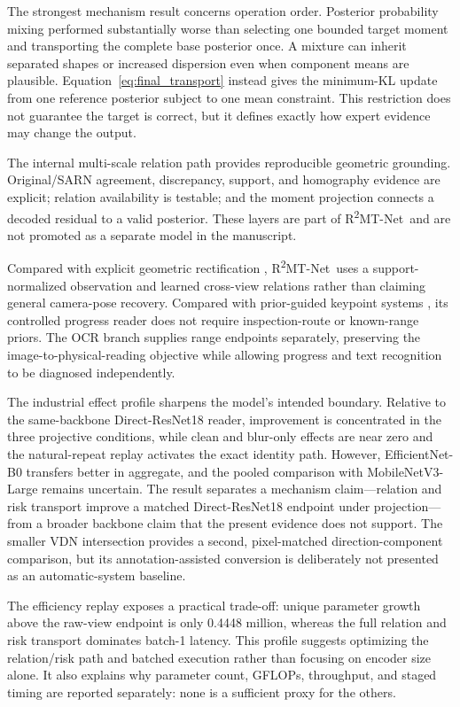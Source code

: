 \documentclass[electronics,article,submit,oneauthor]{Definitions/mdpi}
\newcommand{\modelname}{R\textsuperscript{2}MT-Net}
\begin{document}
The strongest mechanism result concerns operation order. Posterior probability mixing performed substantially worse than selecting one bounded target moment and transporting the complete base posterior once. A mixture can inherit separated shapes or increased dispersion even when component means are plausible. Equation~\eqref{eq:final_transport} instead gives the minimum-KL update from one reference posterior subject to one mean constraint. This restriction does not guarantee the target is correct, but it defines exactly how expert evidence may change the output.

The internal multi-scale relation path provides reproducible geometric grounding. Original/SARN agreement, discrepancy, support, and homography evidence are explicit; relation availability is testable; and the moment projection connects a decoded residual to a valid posterior. These layers are part of \modelname\ and are not promoted as a separate model in the manuscript.

Compared with explicit geometric rectification \cite{tan2024transunet,lee2026p2yolo}, \modelname\ uses a support-normalized observation and learned cross-view relations rather than claiming general camera-pose recovery. Compared with prior-guided keypoint systems \cite{chu2025prikmet}, its controlled progress reader does not require inspection-route or known-range priors. The OCR branch supplies range endpoints separately, preserving the image-to-physical-reading objective while allowing progress and text recognition to be diagnosed independently.

The industrial effect profile sharpens the model's intended boundary. Relative to the same-backbone Direct-ResNet18 reader, improvement is concentrated in the three projective conditions, while clean and blur-only effects are near zero and the natural-repeat replay activates the exact identity path. However, EfficientNet-B0 transfers better in aggregate, and the pooled comparison with MobileNetV3-Large remains uncertain. The result separates a mechanism claim---relation and risk transport improve a matched Direct-ResNet18 endpoint under projection---from a broader backbone claim that the present evidence does not support. The smaller VDN intersection provides a second, pixel-matched direction-component comparison, but its annotation-assisted conversion is deliberately not presented as an automatic-system baseline.

The efficiency replay exposes a practical trade-off: unique parameter growth above the raw-view endpoint is only 0.4448 million, whereas the full relation and risk transport dominates batch-1 latency. This profile suggests optimizing the relation/risk path and batched execution rather than focusing on encoder size alone. It also explains why parameter count, GFLOPs, throughput, and staged timing are reported separately: none is a sufficient proxy for the others.
\end{document}
